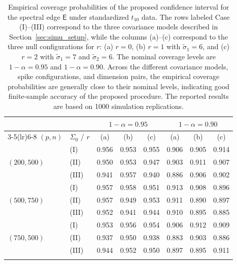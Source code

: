 \documentclass[12pt]{article}
\theoremstyle{plain}
\numberwithin{equation}{section}
\begin{document}
\begin{table}[!ht]
	\centering
	\begingroup
	\footnotesize
	\setlength{\tabcolsep}{5pt}
	\renewcommand{\arraystretch}{1.0}
	\begin{tabular}{llcccccc}
		\toprule
		& & \multicolumn{3}{c}{$1-\alpha=0.95$} & \multicolumn{3}{c}{$1-\alpha=0.90$} \\
		\cmidrule(lr){3-5}\cmidrule(lr){6-8}
		$(p,n)$ & $\Sigma_0$ / $r$ & (a) & (b) & (c) & (a) & (b) & (c) \\
		\midrule
		\multirow{3}{*}{$(200,500)$}
		& (I)   & 0.956 & 0.953 & 0.955 & 0.906 & 0.905 & 0.914 \\
		& (II)  & 0.950 & 0.953 & 0.947 & 0.903 & 0.911 & 0.907 \\
		& (III) & 0.941 & 0.957 & 0.940 & 0.886 & 0.906 & 0.902 \\
		\midrule
		\multirow{3}{*}{$(500,750)$}
		& (I)   & 0.957 & 0.958 & 0.951 & 0.913 & 0.908 & 0.896 \\
		& (II)  & 0.957 & 0.949 & 0.953 & 0.911 & 0.890 & 0.897 \\
		& (III) & 0.952 & 0.941 & 0.944 & 0.910 & 0.895 & 0.885 \\
		\midrule
		\multirow{3}{*}{$(750,500)$}
		& (I)   & 0.953 & 0.956 & 0.954 & 0.906 & 0.912 & 0.909 \\
		& (II)  & 0.937 & 0.950 & 0.938 & 0.883 & 0.903 & 0.886 \\
		& (III) & 0.944 & 0.952 & 0.950 & 0.897 & 0.895 & 0.911 \\
		\bottomrule
		\vspace{0.2pt}
	\end{tabular}
	\endgroup
	\caption{Empirical coverage probabilities of the proposed confidence interval for the spectral edge $\mathsf E$ under standardized $t_{10}$ data. The rows labeled Case (I)--(III) correspond to the three covariance models described in Section~\ref{sec:simu_setup}, while the columns (a)--(c) correspond to the three null configurations for $r$: (a) $r=0$, (b) $r=1$ with $\widetilde{\sigma}_1=6$, and (c) $r=2$ with $\widetilde{\sigma}_1=7$ and $\widetilde{\sigma}_2=6$. The nominal coverage levels are $1-\alpha=0.95$ and $1-\alpha=0.90$. Across the different covariance models, spike configurations, and dimension pairs, the empirical coverage probabilities are generally close to their nominal levels, indicating good finite-sample accuracy of the proposed procedure. The reported results are based on 1000 simulation replications.}
	\label{tab:coverage_student_appendix}
\end{table}
\end{document}

